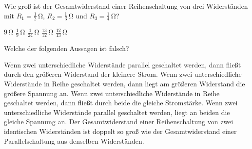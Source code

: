 \documentclass[11pt]{exam}
\begin{document}
\begin{questions}
\vspace{3mm}\question Wie groß ist der Gesamtwiderstand einer Reihenschaltung von drei Widerständen mit \(R_1=\mathrm{\frac{1}{2}\,\Omega}\), \(R_2=\mathrm{\frac{1}{3}\,\Omega}\) und \(R_3=\mathrm{\frac{1}{4}\,\Omega}\)?

\begin{choices}
	\choice \(\mathrm{9\,\Omega}\)
	\choice \(\mathrm{\frac{1}{9}\,\Omega}\)
	\choice \(\mathrm{\frac{1}{24}\,\Omega}\)
	\choice \(\mathrm{\frac{13}{12}\,\Omega}\)
	\choice \(\mathrm{\frac{12}{13}\,\Omega}\)
\end{choices}

\vspace{3mm}\question Welche der folgenden Aussagen ist falsch?

\begin{choices}
	\choice Wenn zwei unterschiedliche Widerstände parallel geschaltet werden, dann fließt durch den größeren Widerstand der kleinere Strom.
	\choice Wenn zwei unterschiedliche Widerstände in Reihe geschaltet werden, dann liegt am größeren Widerstand die größere Spannung an.
	\choice Wenn zwei unterschiedliche Widerstände in Reihe geschaltet werden, dann fließt durch beide die gleiche Stromstärke.
	\choice Wenn zwei unterschiedliche Widerstände parallel geschaltet werden, liegt an beiden die gleiche Spannung an.
	\choice Der Gesamtwiderstand einer Reihenschaltung von zwei identischen Widerständen ist doppelt so groß wie der Gesamtwiderstand einer Parallelschaltung aus denselben Widerständen.
\end{choices}

\vspace{3mm}\end{questions}
\end{document}
